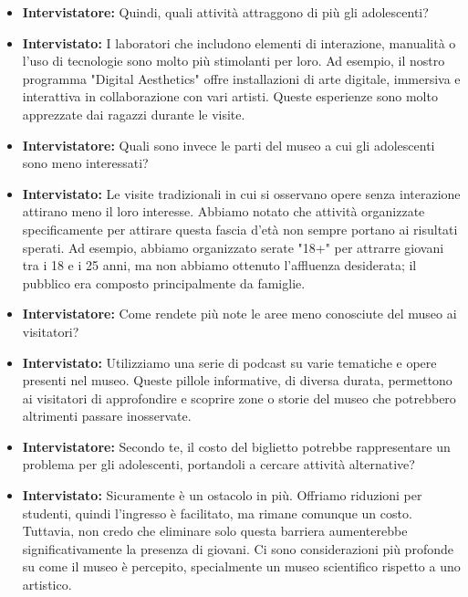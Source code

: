 \documentclass{article}
\begin{document}
\begin{itemize}
    \item \textbf{Intervistatore:} Quindi, quali attività attraggono di più gli adolescenti?
    
    \item \textbf{Intervistato:} I laboratori che includono elementi di interazione, manualità o l'uso di tecnologie sono molto più stimolanti per loro. Ad esempio, il nostro programma "Digital Aesthetics" offre installazioni di arte digitale, immersiva e interattiva in collaborazione con vari artisti. Queste esperienze sono molto apprezzate dai ragazzi durante le visite.
    
    \item \textbf{Intervistatore:} Quali sono invece le parti del museo a cui gli adolescenti sono meno interessati?
    
    \item \textbf{Intervistato:} Le visite tradizionali in cui si osservano opere senza interazione attirano meno il loro interesse. Abbiamo notato che attività organizzate specificamente per attirare questa fascia d'età non sempre portano ai risultati sperati. Ad esempio, abbiamo organizzato serate "18+" per attrarre giovani tra i 18 e i 25 anni, ma non abbiamo ottenuto l'affluenza desiderata; il pubblico era composto principalmente da famiglie.
    
    \item \textbf{Intervistatore:} Come rendete più note le aree meno conosciute del museo ai visitatori?
    
    \item \textbf{Intervistato:} Utilizziamo una serie di podcast su varie tematiche e opere presenti nel museo. Queste pillole informative, di diversa durata, permettono ai visitatori di approfondire e scoprire zone o storie del museo che potrebbero altrimenti passare inosservate.
    
    \item \textbf{Intervistatore:} Secondo te, il costo del biglietto potrebbe rappresentare un problema per gli adolescenti, portandoli a cercare attività alternative?
    
    \item \textbf{Intervistato:} Sicuramente è un ostacolo in più. Offriamo riduzioni per studenti, quindi l'ingresso è facilitato, ma rimane comunque un costo. Tuttavia, non credo che eliminare solo questa barriera aumenterebbe significativamente la presenza di giovani. Ci sono considerazioni più profonde su come il museo è percepito, specialmente un museo scientifico rispetto a uno artistico.
    

\end{itemize}
\end{document}
